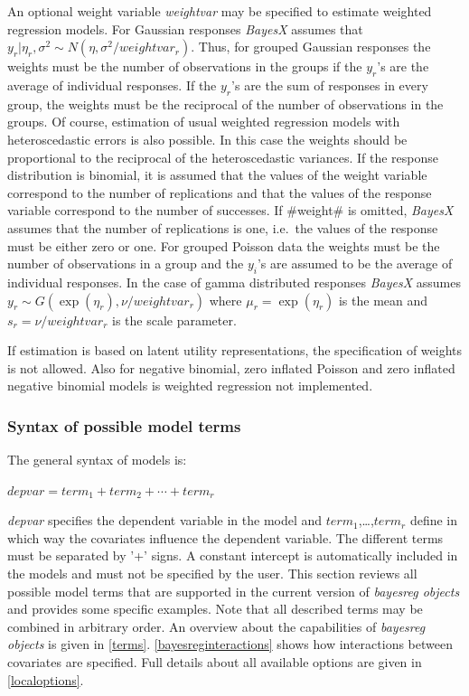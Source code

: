 An optional weight variable {\em weightvar} may be specified to
estimate weighted regression models. For Gaussian responses {\em
BayesX} assumes that $y_r|\eta_r,\sigma^2 \sim
N(\eta,\sigma^2/weightvar_r)$. Thus, for grouped Gaussian
responses the weights must be the number of observations in the
groups if the $y_r$'s are the average of individual responses. If
the $y_r$'s are the sum of responses in every group, the weights
must be the reciprocal of the number of observations in the
groups. Of course, estimation of usual weighted regression models
with heteroscedastic errors  is also possible. In this case the
weights should be proportional to the reciprocal of the
heteroscedastic variances. If the response distribution is
binomial, it is assumed that the values of the weight variable
correspond to the number of replications and that the values of
the response variable correspond to the number of successes. If
#weight# is omitted, {\em BayesX} assumes that the number of
replications is one, i.e.~the values of the response must be
either zero or one. For grouped Poisson data the weights must be
the number of observations in a group and the $y_i$'s are assumed
to be the average of individual responses. In the case of gamma
distributed responses {\em BayesX} assumes $y_r \sim
G(\exp(\eta_r),\nu/weightvar_r)$ where $\mu_r= \exp(\eta_r)$ is
the mean and $s_r = \nu/weightvar_r$ is the scale parameter.

If estimation is based on latent utility representations, the
specification of weights is not allowed. Also for negative
binomial, zero inflated Poisson and zero inflated negative 
binomial models is weighted regression not implemented.

\subsubsection{Syntax of possible model terms}
\label{modelsyntax}

The general syntax of models is:

$depvar = term_1 + term_2 + \cdots + term_r$

{\em depvar} specifies the dependent variable in the model and
$term_1$,\dots,$term_r$ define in which way the covariates
influence the dependent variable. The different terms must be
separated by '+' signs. A constant intercept is automatically
included in the models and must not be specified by the user. This
section reviews all possible model terms that are supported in the
current version of {\em bayesreg objects} and provides some
specific examples. Note that all described terms may be combined
in arbitrary order. An overview about the capabilities of {\em
bayesreg objects} is given in \autoref{terms}.
\autoref{bayesreginteractions} shows how interactions between
covariates are specified. Full details about all available options
are given in \autoref{localoptions}.

